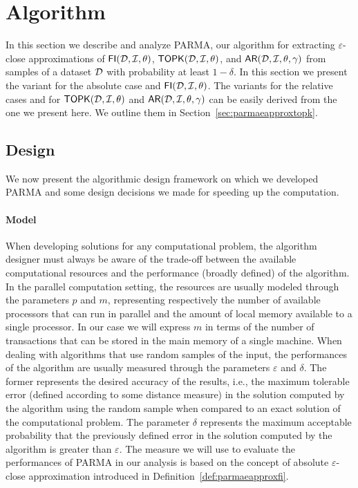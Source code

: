 \section{Algorithm}
\label{sec:parmaparmaalgo}
In this section we describe and analyze PARMA, our algorithm for extracting
$\varepsilon$-close approximations of $\mathsf{FI}({\cal D},{\cal I},\theta)$,
$\mathsf{TOPK}({\cal D},{\cal I},\theta)$, and $\mathsf{AR}({\cal D},{\cal I},\theta,\gamma)$ from samples of a dataset
${\cal D}$ with probability at least $1-\delta$. In this section we present the
variant for the absolute case and $\mathsf{FI}({\cal D},{\cal I},\theta)$. The variants for the
relative cases and for $\mathsf{TOPK}({\cal D},{\cal I},\theta)$ and
$\mathsf{AR}({\cal D},{\cal I},\theta,\gamma)$ can be easily derived from the one
we present here. We outline them in Section~\ref{sec:parmaeapproxtopk}. 

\subsection{Design}\label{subsec:parmadesign}
We now present the algorithmic design framework on which we developed PARMA and
some design decisions we made for speeding up the computation. 

\paragraph*{Model}When developing solutions for any computational problem,
the algorithm designer must always be aware of the trade-off between the available
computational resources and the performance (broadly defined) of the algorithm.
In the parallel computation setting, the resources are usually modeled through
the parameters $p$ and $m$, representing respectively the number of available
processors that can run in parallel and the amount of local memory available to
a single processor. In our case we will express $m$ in terms of the number of
transactions that can be stored in the main memory of a single machine.
When dealing with algorithms that use random samples of the input, the
performances of the algorithm are usually measured through the parameters
$\varepsilon$ and $\delta$. The former represents the desired accuracy of the
results, i.e., the maximum tolerable error (defined according to some distance
measure) in the solution computed by the algorithm using the random sample
when compared to an exact solution of the computational problem. The parameter
$\delta$ represents the maximum acceptable probability that the previously
defined error in the solution computed by the algorithm is greater than
$\varepsilon$. The measure we will use to evaluate the performances of PARMA in
our analysis is based on the concept of absolute $\varepsilon$-close
approximation introduced in Definition~\ref{def:parmaeapproxfi}.

